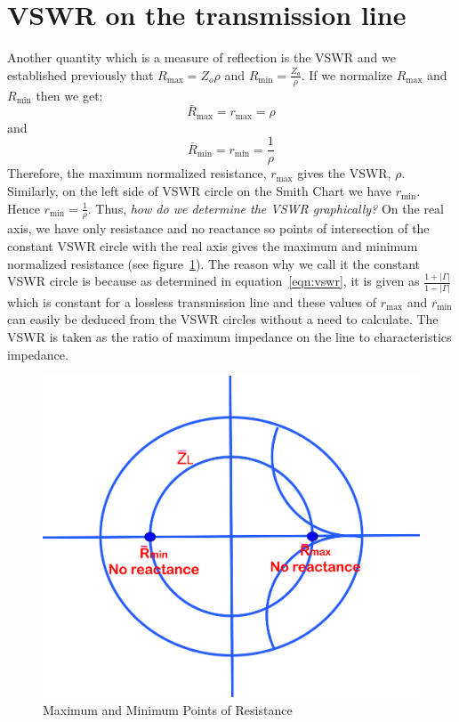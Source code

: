 \section{VSWR on the transmission line}
Another quantity which is a measure of reflection is the VSWR and we established previously that $R_\max = Z_{o}\rho$ and $R_\min = \frac{Z_o}{\rho}$. If we normalize $R_\max$ and $R_\min$ then we get:
\begin{equation}
\bar{R}_\max = r_\max = {\rho}
\end{equation}
and
\begin{equation}
\bar{R}_\min = r_\min = \frac{1}{\rho}
\end{equation}
Therefore, the maximum normalized resistance, $r_\max$ gives the VSWR, $\rho$. Similarly, on the left side of VSWR circle on the Smith Chart we have $r_\min$. Hence $r_\min = \frac{1}{\rho}$. Thus, \emph{how do we determine the VSWR graphically?} On the real axis, we have only resistance and no reactance so points of intersection of the constant VSWR circle with the real axis gives the maximum and minimum normalized resistance (see figure~\ref{fig:oijhgfdsa}).  The reason why we call it the constant VSWR circle is because as determined in equation~\eqref{eqn:vswr}, it is given as $\frac{1 + |\Gamma|}{1 - |\Gamma|}$ which is constant for a lossless transmission line and these values of $r_\max$ and $r_\min$ can easily be deduced from the VSWR circles without a need to calculate. The VSWR is taken as the ratio of maximum impedance on the line to characteristics impedance.
\begin{figure}[h]
\centering
\includegraphics[width=0.7\linewidth]{./graphics/oijhgfdsa}
\caption{Maximum and Minimum Points of Resistance}
\label{fig:oijhgfdsa}
\end{figure}

